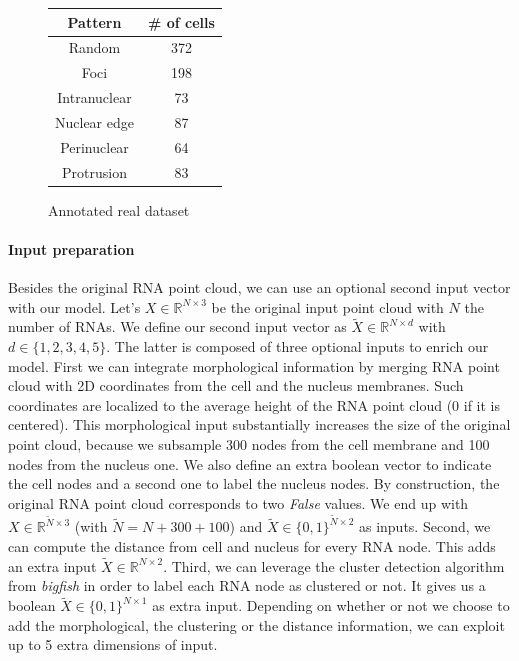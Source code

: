 \begin{figure}
	\centering
	\begin{tabular}{| c | c |}
		\hline
		Pattern & \# of cells \\
		\hline
		Random & 372\\
		Foci & 198\\
		Intranuclear & 73\\
		Nuclear edge & 87\\
		Perinuclear & 64\\
		Protrusion & 83\\
		\hline
	\end{tabular}
	\caption{Annotated real dataset}
	\label{table:real_dataset}
\end{figure}


\paragraph{Input preparation}

Besides the original \ac{RNA} point cloud, we can use an optional second input vector with our model.
Let's $X \in \mathbb{R}^{N \times 3}$ be the original input point cloud with $N$ the number of \ac{RNA}s.
We define our second input vector as $\tilde{X} \in \mathbb{R}^{N \times d}$ with $d \in \{1, 2, 3, 4, 5\}$.
The latter is composed of three optional inputs to enrich our model.
First we can integrate morphological information by merging \ac{RNA} point cloud with 2D coordinates from the cell and the nucleus membranes.
Such coordinates are localized to the average height of the \ac{RNA} point cloud (0 if it is centered).
This morphological input substantially increases the size of the original point cloud, because we subsample 300 nodes from the cell membrane and 100 nodes from the nucleus one.
We also define an extra boolean vector to indicate the cell nodes and a second one to label the nucleus nodes.
By construction, the original \ac{RNA} point cloud corresponds to two \emph{False} values.
We end up with $X \in \mathbb{R}^{\tilde{N} \times 3}$ (with $\tilde{N} = N + 300 + 100$) and $\tilde{X} \in \{0, 1\}^{\tilde{N} \times 2}$ as inputs.
Second, we can compute the distance from cell and nucleus for every \ac{RNA} node.
This adds an extra input $\tilde{X} \in \mathbb{R}^{N \times 2}$.
Third, we can leverage the cluster detection algorithm from \emph{bigfish} in order to label each \ac{RNA} node as clustered or not.
It gives us a boolean $\tilde{X} \in \{0, 1\}^{N \times 1}$ as extra input.
Depending on whether or not we choose to add the morphological, the clustering or the distance information, we can exploit up to 5 extra dimensions of input.

